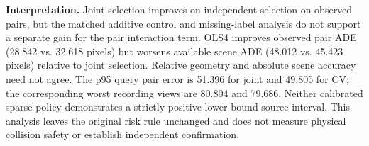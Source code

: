\documentclass[10pt,letterpaper]{article}
\begin{document}
\textbf{Interpretation.} Joint selection improves on independent
selection on observed pairs, but the matched additive control and
missing-label analysis do not support a separate gain for the
pair interaction term. OLS4 improves observed pair ADE (28.842 vs.
32.618 pixels) but worsens available scene ADE (48.012 vs. 45.423
pixels) relative to joint selection. Relative geometry and absolute
scene accuracy need not agree. The p95 query pair error is 51.396
for joint and 49.805 for CV; the corresponding worst recording
views are 80.804 and 79.686. Neither calibrated sparse policy
demonstrates a strictly positive lower-bound source interval.
This analysis leaves the original risk rule unchanged and does not
measure physical collision safety or establish independent confirmation.
\end{document}
